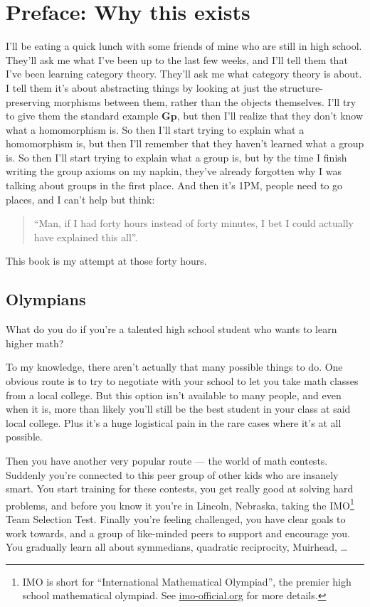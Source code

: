 \chapter*{Preface: Why this exists}
I'll be eating a quick lunch with some friends of mine who are still in high school.
They'll ask me what I've been up to the last few weeks,
and I'll tell them that I've been learning category theory.
They'll ask me what category theory is about.
I tell them it's about abstracting things by looking at just the
structure-preserving morphisms between them, rather than the objects themselves.
I'll try to give them the standard example $\mathbf{Gp}$,
but then I'll realize that they don't know what a homomorphism is.
So then I'll start trying to explain what a homomorphism is,
but then I'll remember that they haven't learned what a group is.
So then I'll start trying to explain what a group is,
but by the time I finish writing the group axioms on my napkin,
they've already forgotten why I was talking about groups in the first place.
And then it's 1PM, people need to go places, and I can't help but think:
\begin{quote}
	``Man, if I had forty hours instead of forty minutes, I bet I could actually have explained this all''.
\end{quote}
This book is my attempt at those forty hours.

\section*{Olympians}
What do you do if you're a talented high school student
who wants to learn higher math?

To my knowledge, there aren't actually that many possible things to do.
One obvious route is to try to negotiate with your school to
let you take math classes from a local college.
But this option isn't available to many people,
and even when it is, more than likely you'll still be the
best student in your class at said local college.
Plus it's a huge logistical pain in the rare cases where it's at all possible.

Then you have another very popular route --- the world of math contests.
Suddenly you're connected to this peer group of other kids who are insanely smart.
You start training for these contests,
you get really good at solving hard problems,
and before you know it you're in Lincoln, Nebraska, taking the
IMO\footnote{IMO is short for ``International Mathematical Olympiad'',
	the premier high school mathematical olympiad.
	See \url{imo-official.org} for more details.} Team Selection Test.
Finally you're feeling challenged, you have clear goals to work towards,
and a group of like-minded peers to support and encourage you.
You gradually learn all about symmedians, quadratic reciprocity, Muirhead, \dots

